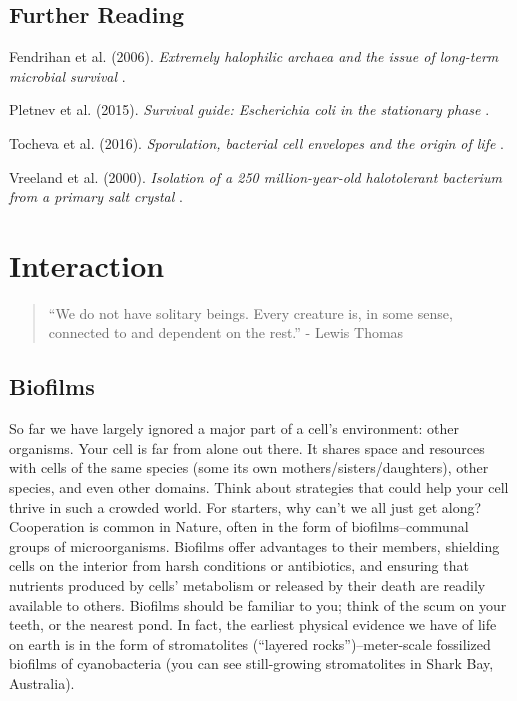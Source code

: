 \documentclass[]{tufte-book}
\begin{document}
\section{Further Reading}\label{further-reading}

Fendrihan et al. (2006). \emph{Extremely halophilic archaea and the
issue of long-term microbial survival} \citep{fendrihan2006}.

Pletnev et al. (2015). \emph{Survival guide: Escherichia coli in the
stationary phase} \citep{pletnev2015}.

Tocheva et al. (2016). \emph{Sporulation, bacterial cell envelopes and
the origin of life} \citep{tocheva2016}.

Vreeland et al. (2000). \emph{Isolation of a 250 million-year-old
halotolerant bacterium from a primary salt crystal}
\citep{vreeland2000}.

\chapter{Interaction}\label{interaction}

\begin{quote}
``We do not have solitary beings. Every creature is, in some sense,
connected to and dependent on the rest.'' - Lewis Thomas
\citep{thomas1974}
\end{quote}

\section{Biofilms}\label{biofilms}

So far we have largely ignored a major part of a cell's environment:
other organisms. Your cell is far from alone out there. It shares space
and resources with cells of the same species (some its own
mothers/sisters/daughters), other species, and even other domains. Think
about strategies that could help your cell thrive in such a crowded
world. For starters, why can't we all just get along? Cooperation is
common in Nature, often in the form of biofilms--communal groups of
microorganisms. Biofilms offer advantages to their members, shielding
cells on the interior from harsh conditions or antibiotics, and ensuring
that nutrients produced by cells' metabolism or released by their death
are readily available to others. Biofilms should be familiar to you;
think of the scum on your teeth, or the nearest pond. In fact, the
earliest physical evidence we have of life on earth is in the form of
stromatolites (``layered rocks'')--meter-scale fossilized biofilms of
cyanobacteria (you can see still-growing stromatolites in Shark Bay,
Australia).
\end{document}
